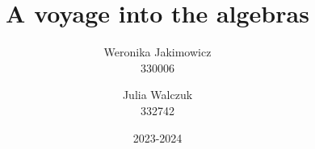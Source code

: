 \documentclass[13pt]{article}
\title{A voyage into the algebras}
\author{
  Weronika Jakimowicz\\
  330006
  \and 
  Julia Walczuk\\
  332742
}
\date{2023-2024}
\begin{document}
\maketitle
\bigskip

%
%
\newpage

%





%



 
\end{document}
